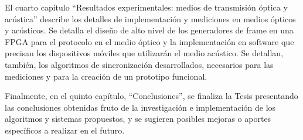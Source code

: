 El cuarto capítulo ``Resultados experimentales: medios de transmisión óptica y acústica'' describe los detalles de implementación y mediciones en medios ópticos y acústicos. Se detalla el diseño de alto nivel de los generadores de frame en una FPGA para el protocolo en el medio óptico y la implementación en software que precisan los dispositivos móviles que utilizarán el medio acústico. Se detallan, también, los algoritmos de sincronización desarrollados, necesarios para las mediciones y para la creación de un prototipo funcional.

Finalmente, en el quinto capítulo, ``Conclusiones'', se finaliza la Tesis presentando las conclusiones obtenidas fruto de la investigación e implementación de los algoritmos y sistemas propuestos, y se sugieren posibles mejoras o aportes específicos a realizar en el futuro.
